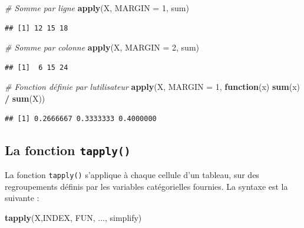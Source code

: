 \documentclass[
  11pt,
]{book}
\newenvironment{Shaded}{\begin{snugshade}}{\end{snugshade}}
\newcommand{\CommentTok}[1]{\textcolor[rgb]{0.56,0.35,0.01}{\textit{#1}}}
\newcommand{\ControlFlowTok}[1]{\textcolor[rgb]{0.13,0.29,0.53}{\textbf{#1}}}
\newcommand{\DataTypeTok}[1]{\textcolor[rgb]{0.13,0.29,0.53}{#1}}
\newcommand{\DecValTok}[1]{\textcolor[rgb]{0.00,0.00,0.81}{#1}}
\newcommand{\KeywordTok}[1]{\textcolor[rgb]{0.13,0.29,0.53}{\textbf{#1}}}
\newcommand{\NormalTok}[1]{#1}
\newcommand{\OperatorTok}[1]{\textcolor[rgb]{0.81,0.36,0.00}{\textbf{#1}}}
\newcommand{\StringTok}[1]{\textcolor[rgb]{0.31,0.60,0.02}{#1}}
\numberwithin{equation}{section}
\numberwithin{countremarque}{section}
\begin{document}
\begin{Shaded}
\begin{Highlighting}[]
\CommentTok{\# Somme par ligne}
\KeywordTok{apply}\NormalTok{(X, }\DataTypeTok{MARGIN =} \DecValTok{1}\NormalTok{, sum)}
\end{Highlighting}
\end{Shaded}

\begin{lstlisting}
## [1] 12 15 18
\end{lstlisting}

\begin{Shaded}
\begin{Highlighting}[]
\CommentTok{\# Somme par colonne}
\KeywordTok{apply}\NormalTok{(X, }\DataTypeTok{MARGIN =} \DecValTok{2}\NormalTok{, sum)}
\end{Highlighting}
\end{Shaded}

\begin{lstlisting}
## [1]  6 15 24
\end{lstlisting}

\begin{Shaded}
\begin{Highlighting}[]
\CommentTok{\# Fonction définie par l\textquotesingle{}utilisateur}
\KeywordTok{apply}\NormalTok{(X, }\DataTypeTok{MARGIN =} \DecValTok{1}\NormalTok{, }\ControlFlowTok{function}\NormalTok{(x) }\KeywordTok{sum}\NormalTok{(x) }\OperatorTok{/}\StringTok{ }\KeywordTok{sum}\NormalTok{(X))}
\end{Highlighting}
\end{Shaded}

\begin{lstlisting}
## [1] 0.2666667 0.3333333 0.4000000
\end{lstlisting}

\hypertarget{boucles_vectorisation_apply_tapply}{%
\subsection{\texorpdfstring{La fonction \texttt{tapply()}}{La fonction tapply()}}\label{boucles_vectorisation_apply_tapply}}

La fonction \texttt{tapply()} s'applique à chaque cellule d'un tableau, sur des regroupements définis par les variables catégorielles fournies. La syntaxe est la suivante :

\begin{Shaded}
\begin{Highlighting}[]
\KeywordTok{tapply}\NormalTok{(X,INDEX, FUN, ..., simplify)}
\end{Highlighting}
\end{Shaded}
\end{document}
